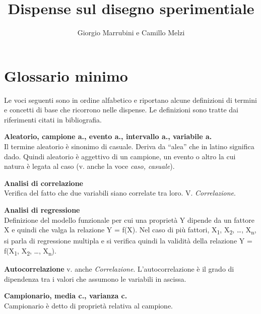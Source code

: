 \documentclass[
  11pt,
]{book}
\title{Dispense sul disegno sperimentiale}
\author{Giorgio Marrubini e Camillo Melzi}
\date{}
\begin{document}
\maketitle

{
\hypersetup{linkcolor=}
\setcounter{tocdepth}{1}
\tableofcontents
}
\hypertarget{section}{%
\chapter*{}\label{section}}

\hypertarget{glossario}{%
\chapter*{Glossario minimo}\label{glossario}}

Le voci seguenti sono in ordine alfabetico e riportano alcune definizioni di termini e concetti di base che ricorrono nelle dispense.
Le definizioni sono tratte dai riferimenti citati in bibliografia.
\citep{legarzantine2014, everittb.s.skrondala.2010, wonnacottt.h.wonnacottr.j.2002}

\textbf{Aleatorio, campione a., evento a., intervallo a., variabile a.}\\
Il termine aleatorio è sinonimo di casuale.
Deriva da ``alea'' che in latino significa dado.
Quindi aleatorio è aggettivo di un campione, un evento o altro la cui natura è legata al caso (v. anche la voce \emph{caso, casuale}).

\textbf{Analisi di correlazione}\\
Verifica del fatto che due variabili siano correlate tra loro.
V. \emph{Correlazione}.

\textbf{Analisi di regressione}\\
Definizione del modello funzionale per cui una proprietà Y dipende da un fattore X e quindi che valga la relazione Y = f(X).
Nel caso di più fattori, X\textsubscript{1}, X\textsubscript{2}, \ldots, X\textsubscript{n}, si parla di regressione multipla e si verifica quindi la validità della relazione Y = f(X\textsubscript{1}, X\textsubscript{2}, \ldots, X\textsubscript{n}).

\textbf{Autocorrelazione} v. anche \emph{Correlazione}.
L'autocorrelazione è il grado di dipendenza tra i valori che assumono le variabili in ascissa.

\textbf{Campionario, media c., varianza c.}\\
Campionario è detto di proprietà relativa al campione.
\end{document}
